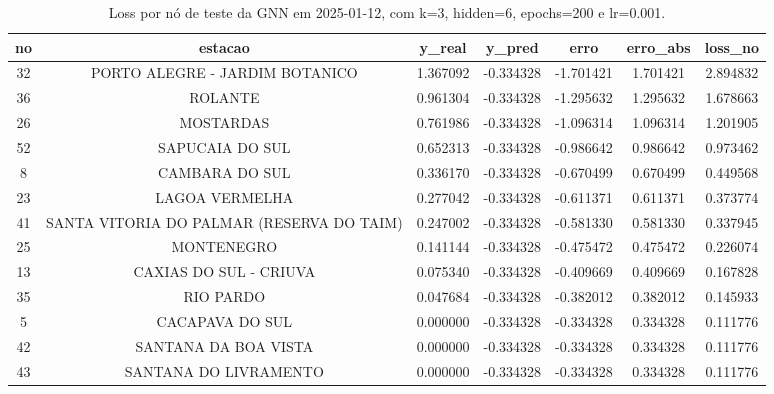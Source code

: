 \begin{table}[h]
\centering
\caption{Loss por nó de teste da GNN em 2025-01-12, com k=3, hidden=6, epochs=200 e lr=0.001.}
\label{tab:gnn_loss_nodes_k3_hidden6}
\begin{tabular}{ccccccc}
\toprule
no & estacao & y\_real & y\_pred & erro & erro\_abs & loss\_no \\
\midrule
32 & PORTO ALEGRE - JARDIM BOTANICO & 1.367092 & -0.334328 & -1.701421 & 1.701421 & 2.894832 \\
36 & ROLANTE & 0.961304 & -0.334328 & -1.295632 & 1.295632 & 1.678663 \\
26 & MOSTARDAS & 0.761986 & -0.334328 & -1.096314 & 1.096314 & 1.201905 \\
52 & SAPUCAIA DO SUL & 0.652313 & -0.334328 & -0.986642 & 0.986642 & 0.973462 \\
8 & CAMBARA DO SUL & 0.336170 & -0.334328 & -0.670499 & 0.670499 & 0.449568 \\
23 & LAGOA VERMELHA & 0.277042 & -0.334328 & -0.611371 & 0.611371 & 0.373774 \\
41 & SANTA VITORIA DO PALMAR (RESERVA DO TAIM) & 0.247002 & -0.334328 & -0.581330 & 0.581330 & 0.337945 \\
25 & MONTENEGRO & 0.141144 & -0.334328 & -0.475472 & 0.475472 & 0.226074 \\
13 & CAXIAS DO SUL - CRIUVA & 0.075340 & -0.334328 & -0.409669 & 0.409669 & 0.167828 \\
35 & RIO PARDO & 0.047684 & -0.334328 & -0.382012 & 0.382012 & 0.145933 \\
5 & CACAPAVA DO SUL & 0.000000 & -0.334328 & -0.334328 & 0.334328 & 0.111776 \\
42 & SANTANA DA BOA VISTA & 0.000000 & -0.334328 & -0.334328 & 0.334328 & 0.111776 \\
43 & SANTANA DO LIVRAMENTO & 0.000000 & -0.334328 & -0.334328 & 0.334328 & 0.111776 \\
\bottomrule
\end{tabular}
\end{table}
